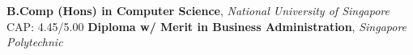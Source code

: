 %
%
%


\begin{education}
					{\textbf{B.Comp (Hons) in Computer Science}, \textit{National University of Singapore}}
	\educationentry{} {CAP: 4.45/5.00}
					{\textbf{Diploma w/ Merit in Business Administration}, \textit{Singapore Polytechnic}}
\end{education}
